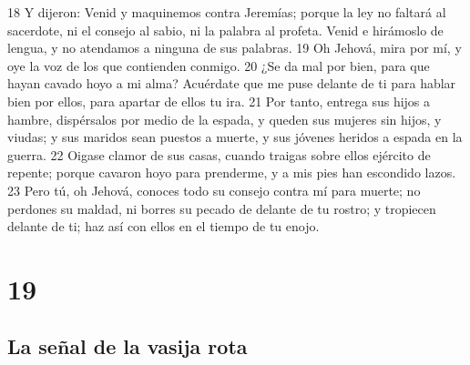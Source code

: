 18 Y dijeron: Venid y maquinemos contra Jeremías; porque la ley no faltará al sacerdote, ni el consejo al sabio, ni la palabra al profeta. Venid e hirámoslo de lengua, y no atendamos a ninguna de sus palabras.
19 Oh Jehová, mira por mí, y oye la voz de los que contienden conmigo.
20 ¿Se da mal por bien, para que hayan cavado hoyo a mi alma? Acuérdate que me puse delante de ti para hablar bien por ellos, para apartar de ellos tu ira.
21 Por tanto, entrega sus hijos a hambre, dispérsalos por medio de la espada, y queden sus mujeres sin hijos, y viudas; y sus maridos sean puestos a muerte, y sus jóvenes heridos a espada en la guerra.
22 Oigase clamor de sus casas, cuando traigas sobre ellos ejército de repente; porque cavaron hoyo para prenderme, y a mis pies han escondido lazos.
23 Pero tú, oh Jehová, conoces todo su consejo contra mí para muerte; no perdones su maldad, ni borres su pecado de delante de tu rostro; y tropiecen delante de ti; haz así con ellos en el tiempo de tu enojo.

\chapter{19}

\section*{La señal de la vasija rota}

